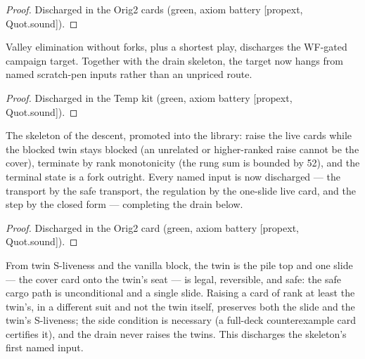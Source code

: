 \begin{proof}
\leanok
Discharged in the Orig2 cards (green, axiom battery [propext, Quot.sound]).
\end{proof}

\begin{theorem}\label{thm:valleyReduction}
\leanok
{}
Valley elimination without forks, plus a shortest play,
discharges the WF-gated campaign target.  Together with the drain
skeleton, the target now hangs from named scratch-pen inputs
rather than an unpriced route.
\end{theorem}

\begin{proof}
\leanok
Discharged in the Temp kit (green, axiom battery [propext, Quot.sound]).
\end{proof}

\begin{theorem}\label{thm:drainSkeleton}
\leanok
{}
The skeleton of the descent, promoted into the library: raise
the live cards while the blocked twin stays blocked (an
unrelated or higher-ranked raise cannot be the cover),
terminate by rank monotonicity (the rung sum is bounded by 52),
and the terminal state is a fork outright.  Every named input is
now discharged --- the transport by the safe transport, the
regulation by the one-slide live card, and the step by the
closed form --- completing the drain below.
\end{theorem}

\begin{proof}
\leanok
Discharged in the Orig2 card (green, axiom battery [propext, Quot.sound]).
\end{proof}

\begin{theorem}\label{thm:safePath}
\leanok
{}
From twin S-liveness and the vanilla block, the twin is the pile
top and one slide --- the cover card onto the twin's seat --- is
legal, reversible, and safe: the safe cargo path is unconditional
and a single slide.  Raising a card of rank at least the twin's,
in a different suit and not the twin itself, preserves both the
slide and the twin's S-liveness; the side condition is necessary
(a full-deck counterexample card certifies it), and the drain
never raises the twins.  This discharges the skeleton's first
named input.
\end{theorem}


